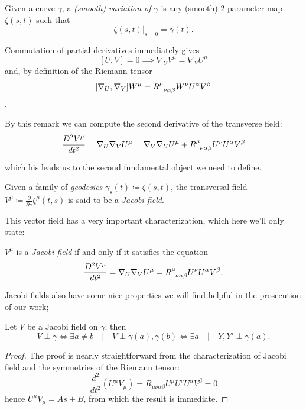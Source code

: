\begin{definition}
	Given a curve \(\gamma\), a \emph{(smooth) variation of \(\gamma\)} is any (smooth) \(2\)-parameter map \(\zeta(s,t)\) such that 
	\[
	\left. \zeta(s, t) \right\vert_{s = 0} = \gamma(t).
	\]
\end{definition}



\begin{remark}
	Commutation of partial derivatives immediately gives 
	\[
	[U, V] = 0 \implies \nabla_U V^{\mu} = \nabla_V U^{\mu}
	\]
	and, by definition of the Riemann tensor
	\[
	[\nabla_U, \nabla_V]W^{\mu} = R\indices{^{\mu}_{\nu\alpha\beta}}W^{\nu}U^{\alpha}V^{\beta}
	\].
\end{remark}

By this remark we can compute the second derivative of the transverse field:
\[
\frac{D^2\tensor{V}{^\mu} }{dt^2} = \nabla_U\nabla_V U^{\mu} = \nabla_V\nabla_U U^{\mu} + R\indices{^{\mu}_{\nu\alpha\beta}}U^{\nu}U^{\alpha}V^{\beta}
\]

which his leads us to the second fundamental object we need to define. 
\begin{definition}
	Given a family of \emph{geodesics} \(\gamma_s(t) \coloneqq \zeta(s,t)\), the transversal field \(V^{\mu} \coloneqq \frac{\partial}{\partial s} \zeta^{\mu}(t,s)\) is said to be a \emph{Jacobi field}.
\end{definition}

This vector field has a very important characterization, which here we'll only state:
\begin{lemma}
\(V^{\mu}\) is a \emph{Jacobi field} if and only if it satisfies the equation
	\begin{equation}
	\label{eq:Jacobi}
		\frac{D^2\tensor{V}{^\mu} }{dt^2} = \nabla_U\nabla_V U^{\mu} =  R\indices{^{\mu}_{\nu\alpha\beta}}U^{\nu}U^{\alpha}V^{\beta}.
	\end{equation}
\end{lemma}

Jacobi fields also have some nice properties we will find helpful in the prosecution of our work;
\begin{lemma}
	\label{lemma:Jacobi-fields-properties}
	Let \(V\) be a Jacobi field on \(\gamma\); then
	\[
	V \perp \gamma \iff \exists a\neq b \quad\vert\quad V\perp \gamma(a),\gamma(b) \iff \exists a \quad\vert\quad Y, Y' \perp \gamma(a).
	\]
\end{lemma}
\begin{proof}
	The proof is nearly straightforward from the characterization of Jacobi field and the symmetries of the Riemann tensor:
	\[
	\frac{d^2}{dt^2} (U^{\mu}V_{\mu}) = R_{\mu\nu\alpha\beta}U^{\mu}U^{\nu}U^{\alpha}V^{\beta} = 0
	\]
	hence \(U^{\mu}V_{\mu} = As + B\), from which the result is immediate.
\end{proof}

